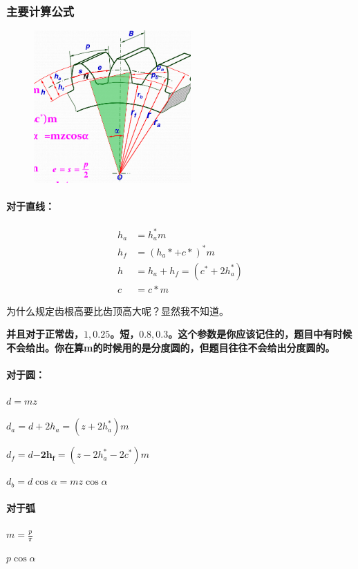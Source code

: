 \documentclass[twocolumn]{ctexart}
\begin{document}
\subsubsection{主要计算公式}
        \begin{figure}[H]
            \centering
            \includegraphics[width=6cm]{img/3.png}
            \end{figure}
\paragraph{对于直线：}
\begin{align*}
h_a&=h_a^*m\\
h_f&=(h_a*+c*)^*m\\
h&=h_a+h_f=(c^*+2h_a^*)\\
c&=c*m
\end{align*}

为什么规定齿根高要比齿顶高大呢？显然我不知道。

\textbf{并且对于正常齿，$1,0.25$。短，$0.8,0.3$。这个参数是你应该记住的，题目中有时候不会给出。你在算m的时候用的是分度圆的，但题目往往不会给出分度圆的。}


\paragraph{对于圆：}
\begin{description}[leftmargin=2.3cm,style=nextline,nosep]%
  \item[分度圆直径] $d=mz$
  \item[齿顶圆直径] $d_a=d+2h_a=(z+2h_a^*)m$
  \item[齿根圆直径] $d_f=d\mathbf{-2h_f} =(z-2h_a^*-2c^*)m$  
  \item[基圆半径] $d_b=d\cos \alpha=mz\cos \alpha$ 
\end{description}

\paragraph{对于弧}
\begin{description}[leftmargin=2.3cm,style=nextline,nosep]%
  \item[分度圆齿距] $m=\frac{p}{\pi}$
  \item[法向齿距] $p \cos \alpha$
\end{description}
\end{document}
